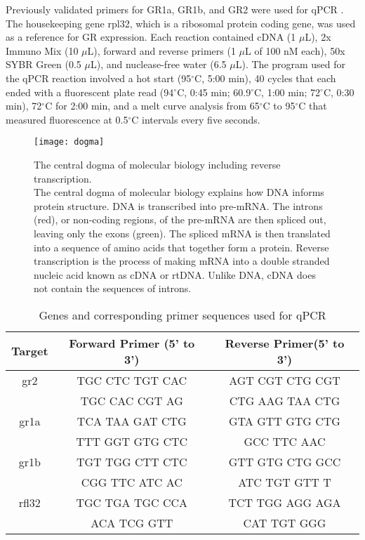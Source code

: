 \documentclass[12pt,twoside]{reedthesis}
\begin{document}
Previously validated primers for GR1a, GR1b, and GR2 were used for qPCR \citep{solomon-lane_early-life_2018}. The
housekeeping gene rpl32, which is a ribosomal protein coding gene, was used as a
reference for GR expression. Each reaction contained cDNA (1 $\mu$L), 2x Immuno Mix (10 $\mu$L),
forward and reverse primers (1 $\mu$L of 100 nM each), 50x SYBR Green (0.5
$\mu$L), and nuclease-free water (6.5 $\mu$L). The program used for the qPCR
reaction involved a hot start (95$^\circ$C, 5:00 min), 40 cycles that each
ended with a fluorescent plate read (94$^\circ$C, 0:45 min; 60.9$^\circ$C, 1:00
min; 72$^\circ$C, 0:30 min), 72$^\circ$C for 2:00 min, and a melt curve analysis from 65$^\circ$C to
95$^\circ$C that measured fluorescence at 0.5$^\circ$C intervals every five seconds.

\begin{figure}[htbp] 
\begin{center} 
\texttt{[image: dogma]}
\caption[The central dogma of molecular biology including reverse transcription]{\footnotesize{The
    central dogma of molecular biology including reverse transcription. \\ The
    central dogma of molecular biology explains how DNA informs protein
    structure. DNA is transcribed into pre-mRNA. The introns (red), or non-coding
    regions, of the pre-mRNA are then spliced out, leaving only the exons
    (green). The spliced mRNA is then translated into a sequence of amino acids
    that together form a protein. Reverse transcription is the process of making
  mRNA into a double stranded nucleic acid known as cDNA or rtDNA. Unlike DNA, cDNA
  does not contain the sequences of introns.}} 
\label{subd}
\end{center} 
\end{figure}

\begin{table}[htbp]
\caption[Genes and corresponding primer sequences used for qPCR]{Genes and corresponding
  primer sequences used for qPCR}
\begin{center}
\footnotesize
\begin{tabular}{ | c | c | c |}
\hline
Target & Forward Primer (5' to 3')& Reverse Primer(5' to 3')\\
\hline
gr2 & TGC CTC TGT CAC & AGT CGT CTG CGT\\
  &  TGC CAC CGT AG & CTG AAG TAA CTG\\
\hline
  gr1a & TCA TAA GAT CTG& GTA GTT GTG CTG\\
  &  TTT GGT GTG CTC &  GCC TTC AAC\\
\hline
    gr1b & TGT TGG CTT CTC  & GTT GTG CTG GCC \\
  & CGG TTC ATC AC & ATC TGT GTT T \\
\hline
    rfl32 & TGC TGA TGC CCA & TCT TGG AGG AGA \\
  & ACA TCG GTT & CAT TGT GGG \\
\hline
\end{tabular}
\end{center}
\end{table}
\end{document}

